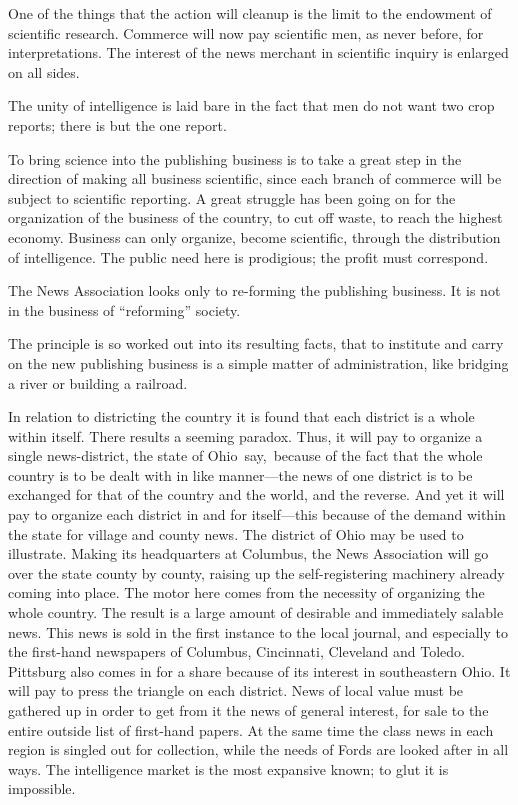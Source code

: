 \documentclass[twoside,symmetric,nobib,justified]{tufte-book}
\begin{document}
One of the things that the action will cleanup is the limit to the
endowment of scientific research. Commerce will now pay scientific men,
as never before, for interpretations. The interest of the news merchant
in scientific inquiry is enlarged on all sides.~

The unity of intelligence is laid bare in the fact that men do not want
two crop reports; there is but the one report.~

To bring science into the publishing business is to take a great step in
the direction of making all business scientific, since each branch of
commerce will be subject to scientific reporting. A great struggle has
been going on for the organization of the business of the country, to
cut off waste, to reach the highest economy. Business can only organize,
become scientific, through the distribution of intelligence. The public
need here is prodigious; the profit must correspond.~

The News Association looks only to re-forming the publishing business.
It is not in the business of ``reforming'' society.~

The principle is so worked out into its resulting facts, that to
institute and carry on the new publishing business is a simple matter of
administration, like bridging a river or building a railroad.~~

In relation to districting the country it is found that each district is
a whole within itself. There results a seeming paradox. Thus, it will
pay to organize a single news-district, the state of Ohio~say,~because
of the fact that the whole country is to be dealt with in like
manner---the news of one district is to be exchanged for that of the
country and the world, and the reverse. And yet it will pay to organize
each district in and for itself---this because of the demand within the
state for village and county news. The district of Ohio may be used to
illustrate. Making its headquarters at Columbus, the News Association
will go over the state county by county, raising up the self-registering
machinery already coming into place. The motor here comes from the
necessity of organizing the whole country. The result is a large amount
of desirable and immediately salable news. This news is sold in the
first instance to the local journal, and especially to the first-hand
newspapers of Columbus, Cincinnati, Cleveland and Toledo. Pittsburg also
comes in for a share because of its interest in southeastern Ohio. It
will pay to press the triangle on each district. News of local value
must be gathered up in order to get from it the news of general
interest, for sale to the entire outside list of first-hand papers. At
the same time the class news in each region is singled out for
collection, while the needs of Fords are looked after in all ways. The
intelligence market is the most expansive known; to glut it is
impossible.~
\end{document}
